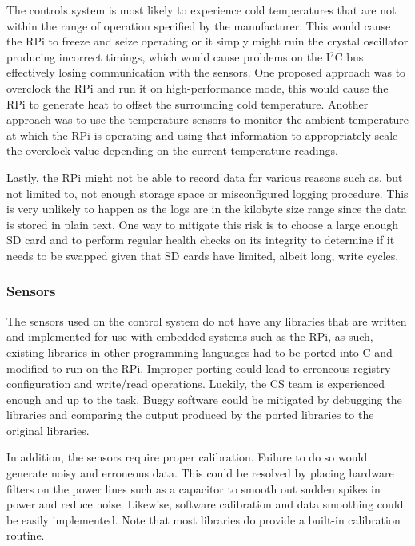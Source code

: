 The controls system is most likely to experience cold temperatures that are not within the range of operation specified by the manufacturer. This would cause the RPi to freeze and seize operating or it simply might ruin the crystal oscillator producing incorrect timings, which would cause problems on the I$^2$C bus effectively losing communication with the sensors.
One proposed approach was to overclock the RPi and run it on high-performance mode, this would cause the RPi to generate heat to offset the surrounding cold temperature. Another approach was to use the temperature sensors to monitor the ambient temperature at which the RPi is operating and using that information to appropriately scale the overclock value depending on the current temperature readings.

Lastly, the RPi might not be able to record data for various reasons such as, but not limited to, not enough storage space or misconfigured logging procedure. This is very unlikely to happen as the logs are in the kilobyte size range since the data is stored in plain text. One way to mitigate this risk is to choose a large enough SD card and to perform regular health checks on its integrity to determine if it needs to be swapped given that SD cards have limited, albeit long, write cycles.

\subsubsection*{Sensors}

\indent\indent The sensors used on the control system do not have any libraries that are written and implemented for use with embedded systems such as the RPi, as such, existing libraries in other programming languages had to be ported into C and modified to run on the RPi. Improper porting could lead to erroneous registry configuration and write/read operations. Luckily, the CS team is experienced enough and up to the task. Buggy software could be mitigated by debugging the libraries and comparing the output produced by the ported libraries to the original libraries.

In addition, the sensors require proper calibration. Failure to do so would generate noisy and erroneous data. This could be resolved by placing hardware filters on the power lines such as a capacitor to smooth out sudden spikes in power and reduce noise. Likewise, software calibration and data smoothing could be easily implemented. Note that most libraries do provide a built-in calibration routine.

